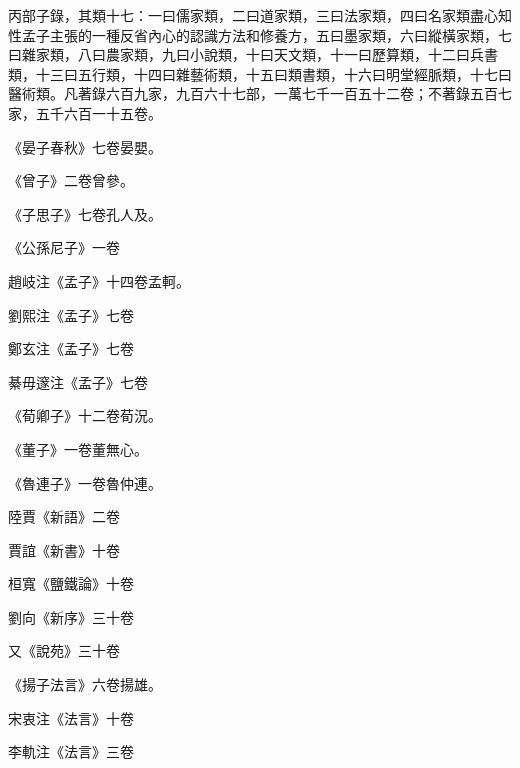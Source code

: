 
\begin{pinyinscope}

 丙部子錄，其類十七：一曰儒家類，二曰道家類，三曰法家類，四曰名家類盡心知性孟子主張的一種反省內心的認識方法和修養方，五曰墨家類，六曰縱橫家類，七曰雜家類，八曰農家類，九曰小說類，十曰天文類，十一曰歷算類，十二曰兵書類，十三曰五行類，十四曰雜藝術類，十五曰類書類，十六曰明堂經脈類，十七曰醫術類。凡著錄六百九家，九百六十七部，一萬七千一百五十二卷；不著錄五百七家，五千六百一十五卷。



 《晏子春秋》七卷晏嬰。



 《曾子》二卷曾參。



 《子思子》七卷孔人及。



 《公孫尼子》一卷



 趙岐注《孟子》十四卷孟軻。



 劉熙注《孟子》七卷



 鄭玄注《孟子》七卷



 綦毋邃注《孟子》七卷



 《荀卿子》十二卷荀況。



 《董子》一卷董無心。



 《魯連子》一卷魯仲連。



 陸賈《新語》二卷



 賈誼《新書》十卷



 桓寬《鹽鐵論》十卷



 劉向《新序》三十卷



 又《說苑》三十卷



 《揚子法言》六卷揚雄。



 宋衷注《法言》十卷



 李軌注《法言》三卷




\end{pinyinscope}
